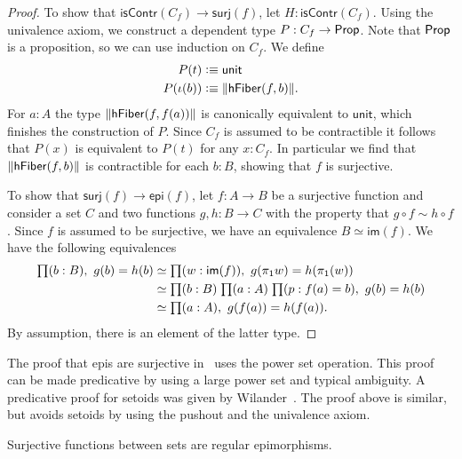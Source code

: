\begin{proof}
To show that $\mathsf{isContr}(C_f)\to\mathsf{surj}(f)$,
let $H:\mathsf{isContr}(C_f)$. Using the univalence axiom, we construct
a dependent type $P:C_f\to\mathsf{Prop}$. Note that $\mathsf{Prop}$ is
a proposition, so we can use induction on $C_f$. We define
\begin{align*}
P(t) & \vcentcolon\equiv \mathsf{unit}\\
P(\iota(b)) & \vcentcolon\equiv \|\mathsf{hFiber}(f,b)\|.
\end{align*}
For $a:A$ the type $\|\mathsf{hFiber}(f,f(a))\|$ is canonically
equivalent to $\mathsf{unit}$, which finishes the construction of $P$.
Since $C_f$ is assumed to be contractible it follows that $P(x)$ is
equivalent to $P(t)$ for any $x:C_f$. In particular we find that
$\|\mathsf{hFiber}(f,b)\|$ is contractible for each $b:B$, showing
that $f$ is surjective.

To show that $\mathsf{surj}(f)\to\mathsf{epi}(f)$,
let $f:A\to B$ be a surjective function and consider a set $C$ and two functions
$g,h:B\to C$ with the property that $g\circ f\sim h\circ f$. Since $f$ 
is assumed to be surjective,
we have an equivalence $B\simeq\mathsf{im}(f)$. We have the following equivalences
\begin{align*}
\prd{b:B} g(b)= h(b) 
& \simeq \prd{w:\mathsf{im}(f)} g(\pi_1 w)= h(\pi_1(w))\\
& \simeq \prd{b:B}{a:A}{p:f(a)= b} g(b)= h(b)\\
& \simeq \prd{a:A} g(f(a))= h(f(a)).
\end{align*}
By assumption, there is an element of the latter type.
\end{proof}
The proof that epis are surjective in~\cite{Mines/R/R:1988} uses the power set operation. 
This proof can be made predicative by using a large power set and typical ambiguity.
A predicative proof for setoids was given by Wilander~\cite{Wilander2010}. 
The proof above is similar, but avoids setoids by using the pushout and the
univalence axiom. 

\begin{lem}\label{lem:images_are_coequalizers}
Surjective functions between sets are regular epimorphisms.
\end{lem}

